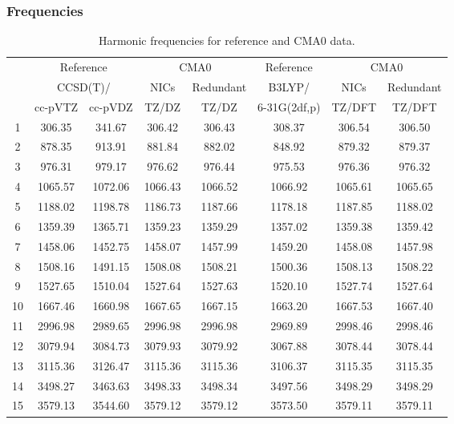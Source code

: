 \documentclass[10pt,oneside]{article}
\begin{document}
\begin{table}[h!]
\subsubsection*{Frequencies}
\centering
\caption{Harmonic frequencies for reference and CMA0 data.}
\begin{tabular}{cccccccc}
\toprule
{} & \multicolumn{2}{c}{Reference} & \multicolumn{2}{c}{CMA0} &    Reference & \multicolumn{2}{c}{CMA0} \\
{} & \multicolumn{2}{c}{CCSD(T)/} &    NICs &  Redundant &       B3LYP/ &    NICs & Redundant \\
{} &   cc-pVTZ & cc-pVDZ &   TZ/DZ &      TZ/DZ & 6-31G(2df,p) &  TZ/DFT &    TZ/DFT \\
\midrule
1  &    306.35 &  341.67 &  306.42 &     306.43 &       308.37 &  306.54 &    306.50 \\
2  &    878.35 &  913.91 &  881.84 &     882.02 &       848.92 &  879.32 &    879.37 \\
3  &    976.31 &  979.17 &  976.62 &     976.44 &       975.53 &  976.36 &    976.32 \\
4  &   1065.57 & 1072.06 & 1066.43 &    1066.52 &      1066.92 & 1065.61 &   1065.65 \\
5  &   1188.02 & 1198.78 & 1186.73 &    1187.66 &      1178.18 & 1187.85 &   1188.02 \\
6  &   1359.39 & 1365.71 & 1359.23 &    1359.29 &      1357.02 & 1359.38 &   1359.42 \\
7  &   1458.06 & 1452.75 & 1458.07 &    1457.99 &      1459.20 & 1458.08 &   1457.98 \\
8  &   1508.16 & 1491.15 & 1508.08 &    1508.21 &      1500.36 & 1508.13 &   1508.22 \\
9  &   1527.65 & 1510.04 & 1527.64 &    1527.63 &      1520.10 & 1527.74 &   1527.64 \\
10 &   1667.46 & 1660.98 & 1667.65 &    1667.15 &      1663.20 & 1667.53 &   1667.40 \\
11 &   2996.98 & 2989.65 & 2996.98 &    2996.98 &      2969.89 & 2998.46 &   2998.46 \\
12 &   3079.94 & 3084.73 & 3079.93 &    3079.92 &      3067.88 & 3078.44 &   3078.44 \\
13 &   3115.36 & 3126.47 & 3115.36 &    3115.36 &      3106.37 & 3115.35 &   3115.35 \\
14 &   3498.27 & 3463.63 & 3498.33 &    3498.34 &      3497.56 & 3498.29 &   3498.29 \\
15 &   3579.13 & 3544.60 & 3579.12 &    3579.12 &      3573.50 & 3579.11 &   3579.11 \\
\bottomrule
\end{tabular}
\end{table}
\end{document}
